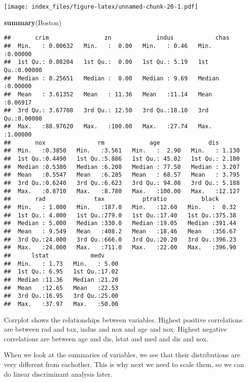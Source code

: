 \documentclass[]{article}
\newenvironment{Shaded}{\begin{snugshade}}{\end{snugshade}}
\newcommand{\KeywordTok}[1]{\textcolor[rgb]{0.13,0.29,0.53}{\textbf{#1}}}
\newcommand{\NormalTok}[1]{#1}
\begin{document}
\texttt{[image: index\_files/figure-latex/unnamed-chunk-20-1.pdf]}

\begin{Shaded}
\begin{Highlighting}[]
\KeywordTok{summary}\NormalTok{(Boston)}
\end{Highlighting}
\end{Shaded}

\begin{verbatim}
##       crim                zn             indus            chas        
##  Min.   : 0.00632   Min.   :  0.00   Min.   : 0.46   Min.   :0.00000  
##  1st Qu.: 0.08204   1st Qu.:  0.00   1st Qu.: 5.19   1st Qu.:0.00000  
##  Median : 0.25651   Median :  0.00   Median : 9.69   Median :0.00000  
##  Mean   : 3.61352   Mean   : 11.36   Mean   :11.14   Mean   :0.06917  
##  3rd Qu.: 3.67708   3rd Qu.: 12.50   3rd Qu.:18.10   3rd Qu.:0.00000  
##  Max.   :88.97620   Max.   :100.00   Max.   :27.74   Max.   :1.00000  
##       nox               rm             age              dis        
##  Min.   :0.3850   Min.   :3.561   Min.   :  2.90   Min.   : 1.130  
##  1st Qu.:0.4490   1st Qu.:5.886   1st Qu.: 45.02   1st Qu.: 2.100  
##  Median :0.5380   Median :6.208   Median : 77.50   Median : 3.207  
##  Mean   :0.5547   Mean   :6.285   Mean   : 68.57   Mean   : 3.795  
##  3rd Qu.:0.6240   3rd Qu.:6.623   3rd Qu.: 94.08   3rd Qu.: 5.188  
##  Max.   :0.8710   Max.   :8.780   Max.   :100.00   Max.   :12.127  
##       rad              tax           ptratio          black       
##  Min.   : 1.000   Min.   :187.0   Min.   :12.60   Min.   :  0.32  
##  1st Qu.: 4.000   1st Qu.:279.0   1st Qu.:17.40   1st Qu.:375.38  
##  Median : 5.000   Median :330.0   Median :19.05   Median :391.44  
##  Mean   : 9.549   Mean   :408.2   Mean   :18.46   Mean   :356.67  
##  3rd Qu.:24.000   3rd Qu.:666.0   3rd Qu.:20.20   3rd Qu.:396.23  
##  Max.   :24.000   Max.   :711.0   Max.   :22.00   Max.   :396.90  
##      lstat            medv      
##  Min.   : 1.73   Min.   : 5.00  
##  1st Qu.: 6.95   1st Qu.:17.02  
##  Median :11.36   Median :21.20  
##  Mean   :12.65   Mean   :22.53  
##  3rd Qu.:16.95   3rd Qu.:25.00  
##  Max.   :37.97   Max.   :50.00
\end{verbatim}

Corrplot shows the relationships between variables. Highest positive
correlations are between rad and tax, indus and nox and age and nox.
Highest negative correlations are between age and dis, lstat and med and
dis and nox.

When we look at the summaries of variables, we see that their
distributions are very different from eachother. This is why next we
need to scale them, so we can do linear discriminant analysis later.
\end{document}
